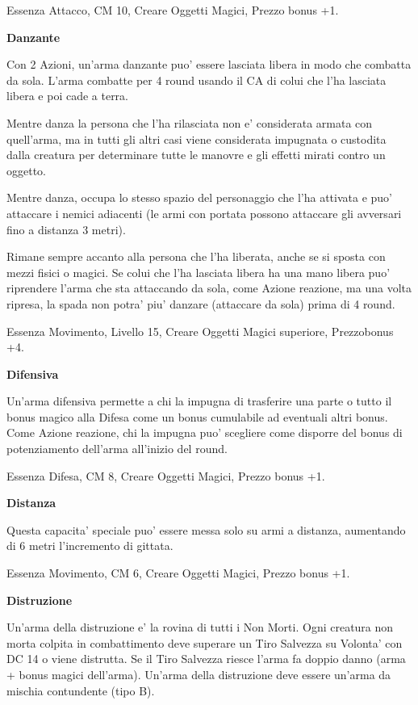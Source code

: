 \documentclass[a4paper,11pt,twoside,openany]{book}
\begin{document}
{		Essenza Attacco, CM 10, Creare Oggetti Magici, Prezzo bonus +1.
		
		\textbf{Danzante}
		
		Con 2 Azioni, un'arma danzante puo' essere lasciata libera in modo che combatta da sola. L'arma combatte per 4 round usando il CA di colui che l'ha lasciata libera e poi cade a terra. 
		
		Mentre danza la persona che l'ha rilasciata non e' considerata armata con quell'arma, ma in tutti gli altri casi viene considerata impugnata o custodita dalla creatura per determinare tutte le manovre e gli effetti mirati contro un oggetto. 
		
		Mentre danza, occupa lo stesso spazio del personaggio che l'ha attivata e puo' attaccare i nemici adiacenti (le armi con portata possono attaccare gli avversari fino a distanza 3 metri). 
		
		Rimane sempre accanto alla persona che l'ha liberata, anche se si sposta con mezzi fisici o magici. Se colui che l'ha lasciata libera ha una mano libera puo' riprendere l'arma che sta attaccando da sola, come Azione reazione, ma una volta ripresa, la spada non potra' piu' danzare (attaccare da sola) prima di 4 round.
		
		Essenza Movimento, Livello 15, Creare Oggetti Magici superiore, Prezzobonus +4.
		
		\textbf{Difensiva}
		
		Un'arma difensiva permette a chi la impugna di trasferire una parte o tutto il bonus magico alla Difesa come un bonus cumulabile ad eventuali altri bonus. Come Azione reazione, chi la impugna puo' scegliere come disporre del bonus di potenziamento dell'arma all'inizio del round.
		
		Essenza Difesa, CM 8, Creare Oggetti Magici, Prezzo bonus +1.
		
		\textbf{Distanza}
		
		Questa capacita' speciale puo' essere messa solo su armi a distanza, aumentando di 6 metri l'incremento di gittata.
		
		Essenza Movimento, CM 6, Creare Oggetti Magici, Prezzo bonus +1.
		
		\textbf{Distruzione}
		
		Un'arma della distruzione e' la rovina di tutti i Non Morti. Ogni creatura non morta colpita in combattimento deve superare un Tiro Salvezza su Volonta' con DC 14 o viene distrutta. Se il Tiro Salvezza riesce l'arma fa doppio danno (arma + bonus magici dell'arma). Un'arma della distruzione deve essere un'arma da mischia contundente (tipo B).
		
}
\end{document}

